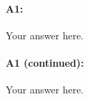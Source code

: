 \paragraph{A1:} Your answer here.





\pagebreak
\paragraph{A1 (continued):} Your answer here.


\pagebreak
